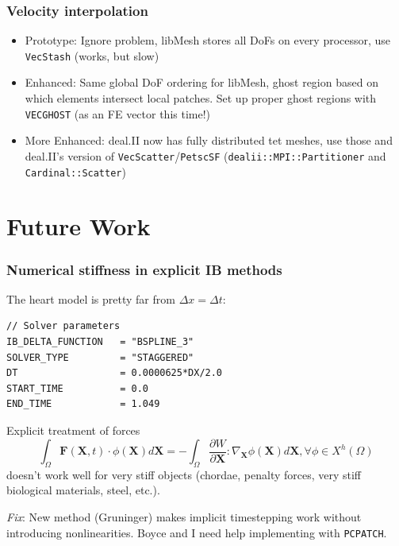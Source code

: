 \documentclass[8pt]{beamer}
\newcommand{\Xb}{\boldsymbol{X}}
\begin{document}
\begin{frame}
    \frametitle{Velocity interpolation}

    \begin{itemize}
      \item[$\blacksquare$] Prototype: Ignore problem, libMesh stores all DoFs
        on every processor, use \texttt{VecStash} (works, but slow)
      \item[$\blacksquare$] Enhanced: Same global DoF ordering for libMesh,
        ghost region based on which elements intersect local patches. Set up
        proper ghost regions with \texttt{VECGHOST} (as an FE vector this time!)
      \item[$\blacksquare$] More Enhanced: deal.II now has fully distributed tet
        meshes, use those and deal.II's version of \texttt{VecScatter}/\texttt{PetscSF}
        (\texttt{dealii::MPI::Partitioner} and \texttt{Cardinal::Scatter})
    \end{itemize}
\end{frame}

\section{Future Work}
\begin{frame}[fragile]
    \frametitle{Numerical stiffness in explicit IB methods}

    The heart model is pretty far from $\Delta x = \Delta t$:
    \begin{verbatim}
// Solver parameters
IB_DELTA_FUNCTION   = "BSPLINE_3"
SOLVER_TYPE         = "STAGGERED"
DT                  = 0.0000625*DX/2.0
START_TIME          = 0.0
END_TIME            = 1.049
    \end{verbatim}
    Explicit treatment of forces
    \begin{equation*}
        \int_\Omega \mathbf{F}(\Xb, t) \cdot \phi(\Xb) d\Xb
        = -\int_\Omega \dfrac{\partial W}{\partial \Xb} : \nabla_{\Xb}
        \phi(\Xb) d\Xb, \forall \phi \in X^h(\Omega)
    \end{equation*}
    doesn't work well for very stiff objects (chordae, penalty forces, very
    stiff biological materials, steel, etc.).

    \vfill
    \emph{Fix}: New method (Gruninger) makes implicit timestepping work without
    introducing nonlinearities. Boyce and I need help implementing with
    \texttt{PCPATCH}.
\end{frame}
\end{document}
